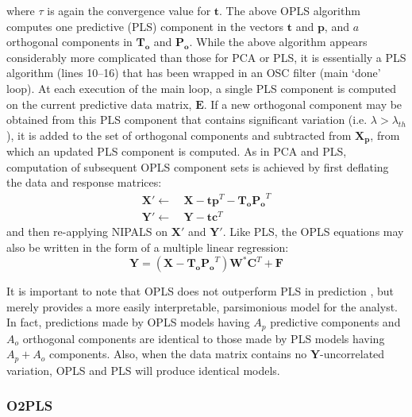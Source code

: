 \begin{doublespace}
where $\tau$ is again the convergence value for $\mathbf{t}$. The above OPLS
algorithm computes one predictive (PLS) component in the vectors $\mathbf{t}$
and $\mathbf{p}$, and $a$ orthogonal components in $\mathbf{T_o}$ and
$\mathbf{P_o}$. While the above algorithm appears considerably more complicated
than those for PCA or PLS, it is essentially a PLS algorithm (lines 10--16)
that has been wrapped in an OSC filter (main `done' loop). At each execution
of the main loop, a single PLS component is computed on the current predictive
data matrix, $\mathbf{E}$. If a new orthogonal component may be obtained from
this PLS component that contains significant variation
(i.e. $\lambda > \lambda_{th}$), it is added to the set of orthogonal
components and subtracted from $\mathbf{X_p}$, from which an updated PLS
component is computed. As in PCA and PLS, computation of subsequent OPLS
component sets is achieved by first deflating the data and response matrices:
\begin{align}
\mathbf{X}' \gets& \: \mathbf{X} -
 \mathbf{t} \mathbf{p}^T -
 \mathbf{T_o} \mathbf{P_o}^T \\
\mathbf{Y}' \gets& \: \mathbf{Y} - \mathbf{t} \mathbf{c}^T
\end{align}
and then re-applying NIPALS on $\mathbf{X}'$ and $\mathbf{Y}'$. Like PLS, the
OPLS equations may also be written in the form of a multiple linear regression:
\begin{equation}
\mathbf{Y} =
 \left( \mathbf{X} - \mathbf{T_o} \mathbf{P_o}^T \right)
 \mathbf{W}^\ast \mathbf{C}^T + \mathbf{F}
\end{equation}

It is important to note that OPLS does not outperform PLS in prediction
\cite{tapp:trac2009}, but merely provides a more easily interpretable,
parsimonious model for the analyst. In fact, predictions made by OPLS
models having $A_p$ predictive components and $A_o$ orthogonal components
are identical to those made by PLS models having $A_p + A_o$ components.
Also, when the data matrix contains no $\mathbf{Y}$-uncorrelated variation,
OPLS and PLS will produce identical models.
\end{doublespace}

\subsubsection{O2PLS}

